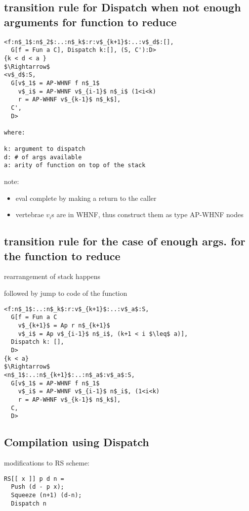 \documentclass[8pt]{extarticle}
\begin{document}
\begin{multicols*}{2}
\begin{itemize}
\end{itemize}

\subsection{transition rule for Dispatch when not enough arguments for function to reduce}

\begin{lstlisting}
<f:n$_1$:n$_2$:..:n$_k$:r:v$_{k+1}$:..:v$_d$:[],
  G[f = Fun a C], Dispatch k:[], (S, C'):D>
{k < d < a }
$\Rightarrow$
<v$_d$:S,
  G[v$_1$ = AP-WHNF f n$_1$
    v$_i$ = AP-WHNF v$_{i-1}$ n$_i$ (1<i<k)
    r = AP-WHNF v$_{k-1}$ n$_k$],
  C',
  D>  

where:

k: argument to dispatch
d: # of args available
a: arity of function on top of the stack
\end{lstlisting}

note:
\begin{itemize}
\item eval complete by making a return to the caller
\item vertebrae $v_i$s are in WHNF, thus construct them as type AP-WHNF nodes
\end{itemize}

\subsection{transition rule for the case of enough args. for the function to reduce}

rearrangement of stack happens

followed by jump to code of the function

\begin{lstlisting}
<f:n$_1$:..:n$_k$:r:v$_{k+1}$:..:v$_a$:S,
  G[f = Fun a C
    v$_{k+1}$ = Ap r n$_{k+1}$
    v$_i$ = Ap v$_{i-1}$ n$_i$, (k+1 < i $\leq$ a)],
  Dispatch k: [],
  D>
{k < a}
$\Rightarrow$
<n$_1$:..:n$_{k+1}$:..:n$_a$:v$_a$:S,
  G[v$_1$ = AP-WHNF f n$_1$
    v$_i$ = AP-WHNF v$_{i-1}$ n$_i$, (1<i<k)
    r = AP-WHNF v$_{k-1}$ n$_k$],
  C,
  D>
\end{lstlisting}


\subsection{Compilation using Dispatch}

modifications to RS scheme:

\begin{lstlisting}
RS[[ x ]] p d n =
  Push (d - p x);
  Squeeze (n+1) (d-n);
  Dispatch n


\end{lstlisting}
\end{multicols*}
\end{document}
